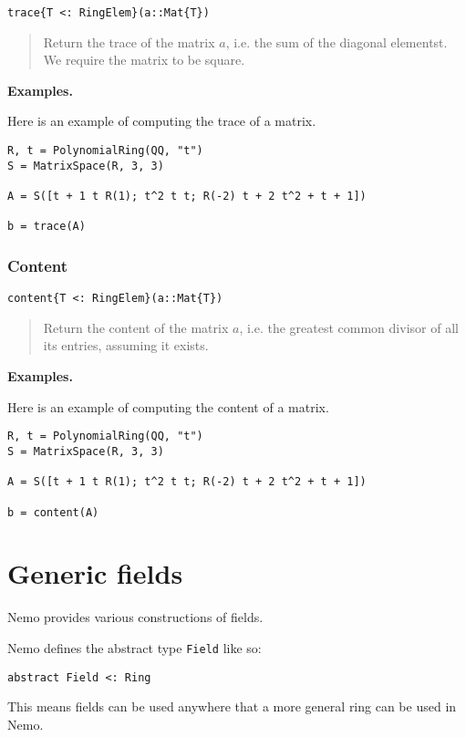 \documentclass[a4paper,10pt]{article}
\newcommand{\code}{\lstinline}
\newcommand{\desc}[1]{\vspace{-3mm}\begin{quote}#1\end{quote}}
\begin{document}
\begin{lstlisting}
trace{T <: RingElem}(a::Mat{T})
\end{lstlisting}

\desc{Return the trace of the matrix $a$, i.e. the sum of the diagonal
elementst. We require the matrix to be square.}

\textbf{Examples.}

Here is an example of computing the trace of a matrix.

\begin{lstlisting}
R, t = PolynomialRing(QQ, "t")
S = MatrixSpace(R, 3, 3)

A = S([t + 1 t R(1); t^2 t t; R(-2) t + 2 t^2 + t + 1])

b = trace(A)
\end{lstlisting}

\subsubsection{Content}

\begin{lstlisting}
content{T <: RingElem}(a::Mat{T})
\end{lstlisting}

\desc{Return the content of the matrix $a$, i.e. the greatest common
divisor of all its entries, assuming it exists.}

\textbf{Examples.}

Here is an example of computing the content of a matrix.

\begin{lstlisting}
R, t = PolynomialRing(QQ, "t")
S = MatrixSpace(R, 3, 3)

A = S([t + 1 t R(1); t^2 t t; R(-2) t + 2 t^2 + t + 1])

b = content(A)
\end{lstlisting}

\section{Generic fields}

Nemo provides various constructions of fields. 

Nemo defines the abstract type \code{Field} like so:

\begin{lstlisting}
abstract Field <: Ring
\end{lstlisting}

This means fields can be used anywhere that a more general ring can be used
in Nemo.
\end{document}
